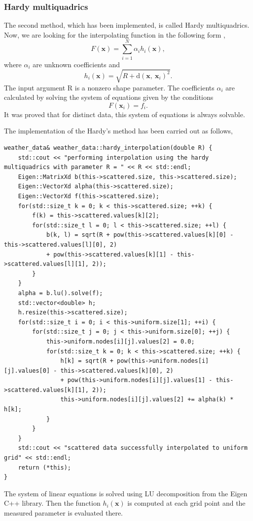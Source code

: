 \documentclass[a4paper, 10pt]{article}
\renewcommand{\vec}[1]{\mathbf{#1}}
\begin{document}
\subsubsection*{Hardy multiquadrics}
The second method, which has been implemented, is called Hardy multiquadrics. Now, we are looking for the interpolating function in the following form \cite{hardy},
\begin{equation}
F\left( \vec{x} \right) = \sum_{i = 1}^{N} \alpha_{i} h_{i} \left( \vec{x} \right), 
\end{equation}
where $ \alpha_{i} $ are unknown coefficients and
\begin{equation}
h_{i} \left( \vec{x} \right) = \sqrt{R + \mathrm{d} \left( \vec{x}, \: \vec{x}_{i} \right)^{2} }.
\end{equation}
The input argument R is a nonzero shape parameter. The coefficients $ \alpha_{i} $ are calculated by solving the system of equations given by the conditions
\begin{equation}
F\left( \vec{x}_{i} \right) = f_{i}.
\end{equation}
It was proved \cite{micchelli} that for distinct data, this system of equations is always solvable.

The implementation of the Hardy's method has been carried out as follows, 
\begin{lstlisting}[caption = implementation of Hardy multiquadrics]
weather_data& weather_data::hardy_interpolation(double R) {
	std::cout << "performing interpolation using the hardy multiquadrics with parameter R = " << R << std::endl;
	Eigen::MatrixXd b(this->scattered.size, this->scattered.size);
	Eigen::VectorXd alpha(this->scattered.size);
	Eigen::VectorXd f(this->scattered.size);
	for(std::size_t k = 0; k < this->scattered.size; ++k) {
		f(k) = this->scattered.values[k][2];
		for(std::size_t l = 0; l < this->scattered.size; ++l) {
			b(k, l) = sqrt(R + pow(this->scattered.values[k][0] - this->scattered.values[l][0], 2)
			+ pow(this->scattered.values[k][1] - this->scattered.values[l][1], 2));
		}
	}
	alpha = b.lu().solve(f);
	std::vector<double> h;
	h.resize(this->scattered.size);
	for(std::size_t i = 0; i < this->uniform.size[1]; ++i) {
		for(std::size_t j = 0; j < this->uniform.size[0]; ++j) {
			this->uniform.nodes[i][j].values[2] = 0.0;
			for(std::size_t k = 0; k < this->scattered.size; ++k) {
				h[k] = sqrt(R + pow(this->uniform.nodes[i][j].values[0] - this->scattered.values[k][0], 2)
				+ pow(this->uniform.nodes[i][j].values[1] - this->scattered.values[k][1], 2));
				this->uniform.nodes[i][j].values[2] += alpha(k) * h[k];
			}
		}
	}
	std::cout << "scattered data successfully interpolated to uniform grid" << std::endl;
	return (*this);
}
\end{lstlisting}
The system of linear equations is solved using LU decomposition from the Eigen C++ library. Then the function $ h_{i} \left( \vec{x} \right) $ is computed at each grid point and the measured parameter is evaluated there.
\end{document}
